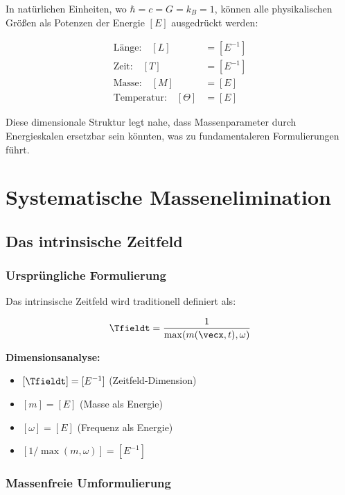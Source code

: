 	In natürlichen Einheiten, wo $\hbar = c = G = k_B = 1$, können alle physikalischen Größen als Potenzen der Energie $[E]$ ausgedrückt werden:
	
	\begin{align}
		\text{Länge:} \quad [L] &= [E^{-1}] \\
		\text{Zeit:} \quad [T] &= [E^{-1}] \\
		\text{Masse:} \quad [M] &= [E] \\
		\text{Temperatur:} \quad [\Theta] &= [E]
	\end{align}
	
	Diese dimensionale Struktur legt nahe, dass Massenparameter durch Energieskalen ersetzbar sein könnten, was zu fundamentaleren Formulierungen führt.
	
	\section{Systematische Massenelimination}
	\label{sec:mass_elimination}
	
	\subsection{Das intrinsische Zeitfeld}
	\label{subsec:time_field_elimination}
	
	\subsubsection{Ursprüngliche Formulierung}
	
	Das intrinsische Zeitfeld wird traditionell definiert als:
	
	\begin{equation}
		\Tfieldt = \frac{1}{\max(m(\vecx,t), \omega)}
		\label{eq:time_field_original}
	\end{equation}
	
	\textbf{Dimensionsanalyse:}
	\begin{itemize}
		\item $[\Tfieldt] = [E^{-1}]$ (Zeitfeld-Dimension)
		\item $[m] = [E]$ (Masse als Energie)
		\item $[\omega] = [E]$ (Frequenz als Energie)
		\item $[1/\max(m,\omega)] = [E^{-1}]$ \checkmark
	\end{itemize}
	
	\subsubsection{Massenfreie Umformulierung}
	
